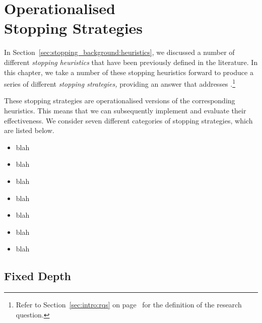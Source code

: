 
\chapter[Operationalised Stopping Strategies]{Operationalised\\Stopping Strategies}\label{chap:strategies}
In Section~\ref{sec:stopping_background:heuristics}, we discussed a number of different \emph{stopping heuristics} that have been previously defined in the literature. In this chapter, we take a number of these stopping heuristics forward to produce a series of different \emph{stopping strategies,} providing an answer that addresses .\footnote{Refer to Section~\ref{sec:intro:rqs} on page~\pageref{sec:intro:rqs} for the definition of the research question.}

\begin{figure}[h]
    \centering
    \vspace{4mm}
    \label{fig:conversion}
    \vspace{-5mm}
\end{figure}

These stopping strategies are operationalised versions of the corresponding heuristics. This means that we can subsequently implement and evaluate their effectiveness. We consider seven different categories of stopping strategies, which are listed below.

\begin{itemize}
    \item{ blah}
    \item{ blah}
    \item{ blah}
    \item{ blah}
    \item{ blah}
    \item{ blah}
    \item{ blah}
\end{itemize}

\section{Fixed Depth}

